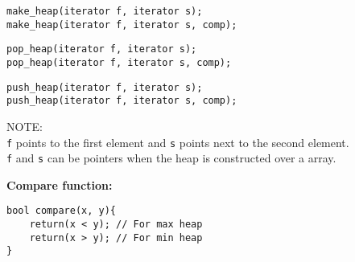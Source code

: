 \begin{verbatim}
make_heap(iterator f, iterator s);
make_heap(iterator f, iterator s, comp);
\end{verbatim}

\vspace{-12pt}

\begin{verbatim}
pop_heap(iterator f, iterator s);
pop_heap(iterator f, iterator s, comp);
\end{verbatim}

\vspace{-12pt}

\begin{verbatim}
push_heap(iterator f, iterator s);
push_heap(iterator f, iterator s, comp);
\end{verbatim}

NOTE:\\
\texttt{f} points to the first element and \texttt{s} points next to the second element.\\
\texttt{f} and \texttt{s} can be pointers when the heap is constructed over a array.

\textbf{Compare function:}\\

\vspace{-6pt}

\begin{verbatim}
bool compare(x, y){
	return(x < y); // For max heap
	return(x > y); // For min heap
}
\end{verbatim}

\vfill\null
\columnbreak

